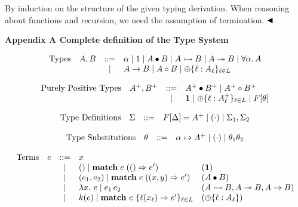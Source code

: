 \documentclass[10pt,a4paper]{amsart}
\begin{document}
By induction on the structure of the given typing derivation. When reasoning about functions and recursion, we need the assumption of termination. $\hfill\blacktriangleleft$\par
 
 

 
\par\medskip\noindent\textbf{Appendix A Complete definition of the Type System}\par
 
  
\par  \quad  \[\begin{array}[]{llcll}\mbox{Types}&A,B&::=&\alpha\mid 1\mid A\bullet B\mid A\rightarrowtail B\mid A\twoheadrightarrow B\mid\forall\alpha.\,A\\
&&\mid&A\to B\mid A\circ B\mid\oplus\{\ell:A_{\ell}\}_{\ell\in L}\end{array}\]\quad  \quad  
   
\par  \quad  \[\begin{array}[]{llcl}\mbox{Purely Positive Types}&A^{+},B^{+}&::=&A^{+}\bullet
B^{+}\mid A^{+}\circ B^{+}\\
&&\mid&\mathbf{1}\mid\oplus\{\ell:A^{+}_{\ell}\}_{\ell\in L}\mid F[\theta]\end{array}\]\quad  \quad  
   
\par  \quad  \[\begin{array}[]{llcl}\mbox{Type Definitions}&\Sigma&::=&F[\Delta]=A^{+}\mid(\cdot)\mid\Sigma_{1},\Sigma_{2}\end{array}\]\quad  \quad  
   
\par  \quad  \[\begin{array}[]{llcl}\mbox{Type Substitutions}&\theta&::=&\alpha\mapsto A^{+}\mid(\cdot)\mid\theta_{1}\theta_{2}\end{array}\]\quad  \quad  
   
\par  \quad  \[\begin{array}[]{llcll}\mbox{Terms}&e&::=&x\\
&&\mid&()\mid\mathbf{match}\;e\;(()\Rightarrow e^{\prime})&(\mathbf{1})\\
&&\mid&(e_{1},e_{2})\mid\mathbf{match}\;e\;((x,y)\Rightarrow e^{\prime})&(A\bullet B)\\
&&\mid&\lambda x.\ e\mid e_{1}\,e_{2}&(A\rightarrowtail B,A\twoheadrightarrow B,A\to B)\\
&&\mid&k(e)\mid\mathbf{match}\nobreak\ e\nobreak\ \{\ell(x_{\ell})\Rightarrow e^{\prime}\}_{\ell\in L}&(\oplus\{\ell:A_{\ell}\})\end{array}\]\quad  \quad  
  
\end{document}
